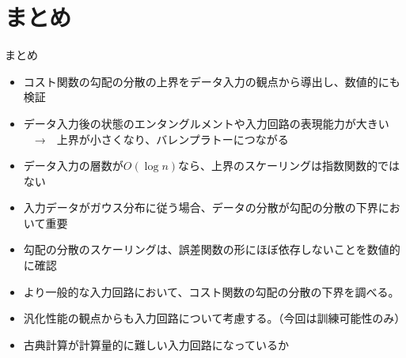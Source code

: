\documentclass[dvipdfmx,10pt,aspectratio=169]{beamer}
\begin{document}
\section{まとめ}
\begin{frame}{まとめ}
    \vspace*{-20pt}
    \hspace*{-50pt}

    \begin{center}
        {\large\colorbox{blue!40}{}}
    \end{center}

    \begin{itemize}
        \item コスト関数の勾配の分散の上界をデータ入力の観点から導出し、数値的にも検証
        \item データ入力後の状態のエンタングルメントや入力回路の表現能力が大きい\\　→　上界が小さくなり、バレンプラトーにつながる
        \item データ入力の層数が$O(\log{n})$なら、上界のスケーリングは指数関数的ではない
        \item 入力データがガウス分布に従う場合、データの分散が勾配の分散の下界において重要
        \item 勾配の分散のスケーリングは、誤差関数の形にほぼ依存しないことを数値的に確認
    \end{itemize}

    \begin{center}
        {\large\colorbox{blue!40}{}}
    \end{center}

    \begin{itemize}
        \item より一般的な入力回路において、コスト関数の勾配の分散の下界を調べる。
        \item 汎化性能の観点からも入力回路について考慮する。（今回は訓練可能性のみ）
        \item 古典計算が計算量的に難しい入力回路になっているか
    \end{itemize}
\end{frame}



\appendix
\end{document}
